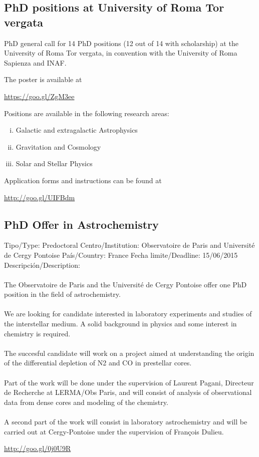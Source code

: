 \documentclass{book}
\begin{document}
\subsection{PhD positions at University of Roma Tor vergata}
 PhD general call for 14 PhD positions (12 out of 14 with scholarship) at the University of Roma Tor vergata, in convention with the University of Roma Sapienza and INAF. 

The poster is available at 
\begin{center}
\url{https://goo.gl/ZgM3ee}
\end{center}

Positions are available in the following research areas: 
 \begin{enumerate}[i)]
 \item Galactic and extragalactic Astrophysics
 \item Gravitation and Cosmology
 \item Solar and Stellar Physics
 \end{enumerate}
Application forms and instructions can be found at
\begin{center}
\url{http://goo.gl/UIFBdm}
\end{center}

\subsection{PhD Offer in Astrochemistry}
Tipo/Type: Predoctoral
Centro/Institution: Observatoire de Paris and Université de Cergy Pontoise
País/Country: France
Fecha limite/Deadline: 15/06/2015
Descripción/Description: \\
 \\
The Observatoire de Paris and the Université de Cergy Pontoise offer one PhD position in the field of astrochemistry.\\
 \\
We are looking for candidate interested in laboratory experiments and studies of the interstellar medium. A solid background in physics and some interest in chemistry is required.\\
 \\
The succesful candidate will work on a project aimed at understanding the origin of the differential depletion of N2 and CO in prestellar cores.\\
 \\
Part of the work will be done under the supervision of Laurent Pagani, Directeur de Recherche at LERMA/Obs Paris, and will consist of analysis of observational data from dense cores and modeling of the chemistry.\\
 \\
A second part of the work will consist in laboratory astrochemistry and will be carried out at Cergy-Pontoise under the supervision of François Dulieu.
\begin{center}
\url{http://goo.gl/0j0U9R}
\end{center}
\end{document}
